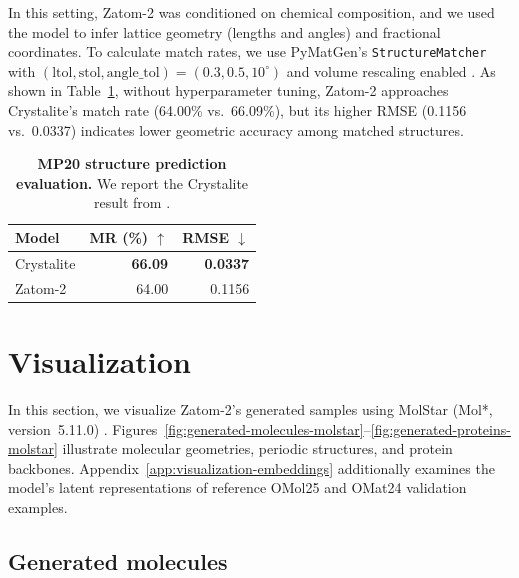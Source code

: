 \documentclass{article} %
\begin{document}
In this setting, Zatom-2 was conditioned on chemical composition, and we used the model to infer lattice geometry (lengths and angles) and fractional coordinates. To calculate match rates, we use PyMatGen's \texttt{StructureMatcher} with
$(\mathrm{ltol},\mathrm{stol},\mathrm{angle\_tol})=(0.3,0.5,10^\circ)$ and
volume rescaling enabled \citep{ong2013pymatgen}. As shown in Table~\ref{tab:mp20-structure-prediction}, without hyperparameter tuning, Zatom-2 approaches Crystalite's match rate (64.00\% vs.\ 66.09\%), but its higher RMSE
(0.1156 vs.\ 0.0337) indicates lower geometric accuracy among matched structures.

\begin{table}[h]
  \centering
  \small
  \caption{\textbf{MP20 structure prediction evaluation.}
  We report the Crystalite result from \citet{hadziveljkovic2026crystalite}.}
  \label{tab:mp20-structure-prediction}
  \vspace{0.4em}
  \setlength{\tabcolsep}{3pt}
  \begin{tabular}{@{}lrr@{}}
    \toprule
    Model & MR (\%) $\uparrow$
    & RMSE $\downarrow$ 
    \\
    \midrule
    Crystalite& \textbf{66.09}
      & \textbf{0.0337} \\
    Zatom-2 & 64.00
      & 0.1156\\
    \bottomrule
  \end{tabular}
\end{table}

\FloatBarrier

\clearpage

\section{Visualization}
\label{app:visualization}

In this section, we visualize Zatom-2's generated samples using MolStar (Mol*, version~5.11.0) \citep{sehnal2021molstar}. Figures~\ref{fig:generated-molecules-molstar}--\ref{fig:generated-proteins-molstar} illustrate molecular geometries, periodic structures, and protein backbones.
Appendix~\ref{app:visualization-embeddings} additionally examines the model's latent representations of reference OMol25 and OMat24 validation examples.

\subsection{Generated molecules}
\label{app:visualization-molecules}
\end{document}
